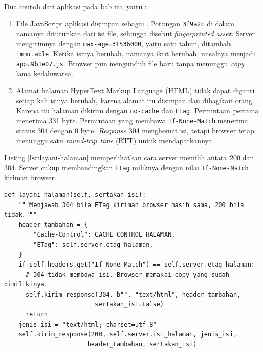 Dua contoh dari aplikasi pada bab ini, yaitu :

\begin{enumerate}
  \item File JavaScript aplikasi disimpan sebagai
        . Potongan
        \texttt{3f9a2c} di dalam namanya diturunkan dari isi file, sehingga
        disebut \textit{fingerprinted asset}. Server mengirimnya dengan
        \texttt{max-age=31536000}, yaitu satu tahun, ditambah
        \texttt{immutable}. Ketika isinya berubah, namanya ikut berubah,
        misalnya menjadi \texttt{app.9b1e07.js}. Browser pun mengunduh file
        baru tanpa menunggu \textit{copy} lama kedaluwarsa.
  \item Alamat halaman HyperText Markup Language (HTML) tidak dapat diganti
        setiap kali isinya berubah,
        karena alamat itu disimpan dan dibagikan orang. Karena itu halaman
         dikirim dengan
        \texttt{no-cache} dan \texttt{ETag}. Permintaan pertama
        menerima 331 byte. Permintaan yang membawa \texttt{If-None-Match}
        menerima status 304 dengan 0 byte. \textit{Response} 304 menghemat isi, tetapi
        browser tetap menunggu satu \textit{round-trip time} (RTT) untuk
        mendapatkannya.
\end{enumerate}

Listing \ref{lst:layani-halaman} memperlihatkan cara server memilih antara
200 dan 304. Server cukup membandingkan \texttt{ETag} miliknya dengan nilai
\texttt{If-None-Match} kiriman browser.

\begin{lstlisting}[style=PythonStyle, caption={Memilih antara 200 dan 304, tersedia di \berkas{sources/chapter04/aplikasi.py}}, label={lst:layani-halaman}]
  def layani_halaman(self, sertakan_isi):
    """Menjawab 304 bila ETag kiriman browser masih sama, 200 bila tidak."""
    header_tambahan = {
        "Cache-Control": CACHE_CONTROL_HALAMAN,
        "ETag": self.server.etag_halaman,
    }
    if self.headers.get("If-None-Match") == self.server.etag_halaman:
      # 304 tidak membawa isi. Browser memakai copy yang sudah dimilikinya.
      self.kirim_response(304, b"", "text/html", header_tambahan,
                         sertakan_isi=False)
      return
    jenis_isi = "text/html; charset=utf-8"
    self.kirim_response(200, self.server.isi_halaman, jenis_isi,
                       header_tambahan, sertakan_isi)
\end{lstlisting}

